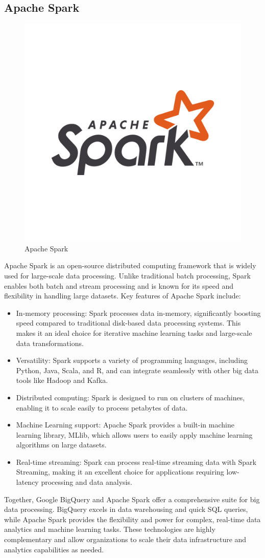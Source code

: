 \subsection{Apache Spark}
\begin{figure}[htp]
    \centering
    \includegraphics[width=0.5\linewidth]{images/training-spark.png}
    \caption{Apache Spark}
\end{figure}
Apache Spark is an open-source distributed computing framework that is widely used for large-scale
data processing. Unlike traditional batch processing, Spark enables both batch and stream processing
and is known for its speed and flexibility in handling large datasets. Key features of Apache Spark
include:
\begin{itemize}
    \item In-memory processing: Spark processes data in-memory, significantly boosting speed compared to
    traditional disk-based data processing systems. This makes it an ideal choice for iterative machine
    learning tasks and large-scale data transformations.
    \item Versatility: Spark supports a variety of programming languages, including Python, Java, Scala,
    and R, and can integrate seamlessly with other big data tools like Hadoop and Kafka.
    \item Distributed computing: Spark is designed to run on clusters of machines, enabling it to scale
    easily to process petabytes of data.
    \item Machine Learning support: Apache Spark provides a built-in machine learning library, MLlib,
    which allows users to easily apply machine learning algorithms on large datasets.
    \item Real-time streaming: Spark can process real-time streaming data with Spark Streaming, making
    it an excellent choice for applications requiring low-latency processing and data analysis.
\end{itemize}
Together, Google BigQuery and Apache Spark offer a comprehensive suite for big data processing.
BigQuery excels in data warehousing and quick SQL queries, while Apache Spark provides the
flexibility and power for complex, real-time data analytics and machine learning tasks. These
technologies are highly complementary and allow organizations to scale their data infrastructure and
analytics capabilities as needed.
